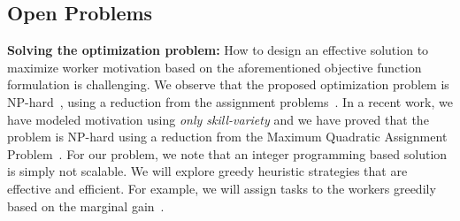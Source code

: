 


\vspace{-0.1in}
\subsection{Open Problems}
\vspace{-0.1in}
 {\bf  Solving the optimization problem:}
How to design an effective solution to maximize worker motivation based on the aforementioned objective function formulation is challenging. %
We observe that the proposed optimization problem is NP-hard~\cite{garey1979computers}, using a reduction from the assignment problems~\cite{roy2015task}. In a recent work, we have modeled motivation using {\em only skill-variety} and we have proved that the problem is NP-hard using a reduction from the Maximum Quadratic Assignment Problem~\cite{arkin2001approximating}. For our problem, we note that an integer programming based solution is simply not scalable. We will explore greedy heuristic strategies that are effective and efficient. For example, we will assign tasks to the workers greedily based on the marginal gain~\cite{roy2015task}. 

